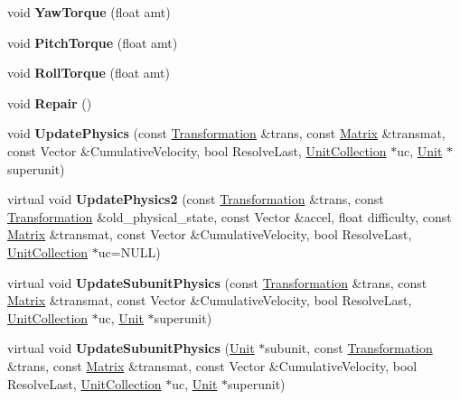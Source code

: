 \begin{DoxyCompactItemize}
\item 
void {\bfseries Yaw\+Torque} (float amt)\hypertarget{classUnit_a39bd9329f3be5725dec1e65f04dcd473}{}\label{classUnit_a39bd9329f3be5725dec1e65f04dcd473}

\item 
void {\bfseries Pitch\+Torque} (float amt)\hypertarget{classUnit_a3e68d7ff7c9b5a5a2eadf128efb0a14e}{}\label{classUnit_a3e68d7ff7c9b5a5a2eadf128efb0a14e}

\item 
void {\bfseries Roll\+Torque} (float amt)\hypertarget{classUnit_a03a42b3c45fea07abf3e56c7d6ff6073}{}\label{classUnit_a03a42b3c45fea07abf3e56c7d6ff6073}

\item 
void {\bfseries Repair} ()\hypertarget{classUnit_a777d175ebabf284021bbaa5a87afb0c8}{}\label{classUnit_a777d175ebabf284021bbaa5a87afb0c8}

\item 
void {\bfseries Update\+Physics} (const \hyperlink{structTransformation}{Transformation} \&trans, const \hyperlink{classMatrix}{Matrix} \&transmat, const Vector \&Cumulative\+Velocity, bool Resolve\+Last, \hyperlink{classUnitCollection}{Unit\+Collection} $\ast$uc, \hyperlink{classUnit}{Unit} $\ast$superunit)\hypertarget{classUnit_a43ad2303a141b9596c7da90c5e055620}{}\label{classUnit_a43ad2303a141b9596c7da90c5e055620}

\item 
virtual void {\bfseries Update\+Physics2} (const \hyperlink{structTransformation}{Transformation} \&trans, const \hyperlink{structTransformation}{Transformation} \&old\+\_\+physical\+\_\+state, const Vector \&accel, float difficulty, const \hyperlink{classMatrix}{Matrix} \&transmat, const Vector \&Cumulative\+Velocity, bool Resolve\+Last, \hyperlink{classUnitCollection}{Unit\+Collection} $\ast$uc=N\+U\+LL)\hypertarget{classUnit_a64220941e32ea28a7e3d061991887b2d}{}\label{classUnit_a64220941e32ea28a7e3d061991887b2d}

\item 
virtual void {\bfseries Update\+Subunit\+Physics} (const \hyperlink{structTransformation}{Transformation} \&trans, const \hyperlink{classMatrix}{Matrix} \&transmat, const Vector \&Cumulative\+Velocity, bool Resolve\+Last, \hyperlink{classUnitCollection}{Unit\+Collection} $\ast$uc, \hyperlink{classUnit}{Unit} $\ast$superunit)\hypertarget{classUnit_a7b0cfafa08733e8ee83d0fd4e5167f78}{}\label{classUnit_a7b0cfafa08733e8ee83d0fd4e5167f78}

\item 
virtual void {\bfseries Update\+Subunit\+Physics} (\hyperlink{classUnit}{Unit} $\ast$subunit, const \hyperlink{structTransformation}{Transformation} \&trans, const \hyperlink{classMatrix}{Matrix} \&transmat, const Vector \&Cumulative\+Velocity, bool Resolve\+Last, \hyperlink{classUnitCollection}{Unit\+Collection} $\ast$uc, \hyperlink{classUnit}{Unit} $\ast$superunit)\hypertarget{classUnit_a2871c7b9fa88f40e03f8fde75683d940}{}\label{classUnit_a2871c7b9fa88f40e03f8fde75683d940}


\end{DoxyCompactItemize}
